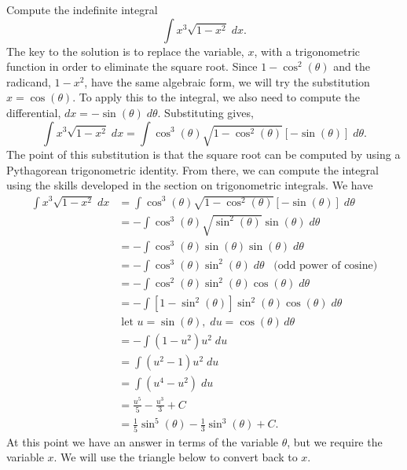 \documentclass[handout]{ximera}
\begin{document}
\begin{example}[example 1]
Compute the indefinite integral
\[
\int x^3 \sqrt{1-x^2} \; dx.
\]
The key to the solution is to replace the variable, $x$, with a trigonometric function 
in order to eliminate the square root.
Since $1-\cos^2(\theta)$ and the radicand, $1-x^2$,
have the same algebraic form, we will try the substitution $x = \cos(\theta)$.
To apply this to the integral, we also need to compute the differential, 
$dx = -\sin(\theta) \; d\theta$.
Substituting gives,
\[
\int x^3 \sqrt{1-x^2} \; dx = \int \cos^3(\theta) \sqrt{1-\cos^2(\theta)} [-\sin(\theta)] \; d\theta.
\]
The point of this substitution is that the square root can be computed by
using a
Pythagorean trigonometric identity. From there, we can compute the integral
using the skills developed in the section on trigonometric integrals.
We have
\begin{align*}
\int x^3 \sqrt{1-x^2} \; dx &= \int \cos^3(\theta) \sqrt{1-\cos^2(\theta)} \left[-\sin(\theta)\right] \; d\theta\\[6pt]
                           &= -\int \cos^3(\theta) \sqrt{\sin^2(\theta)} \sin(\theta) \; d\theta\\[6pt]
                           &= -\int \cos^3(\theta) \sin(\theta) \sin(\theta) \; d\theta\\[6pt]
                           &= -\int \cos^3(\theta) \sin^2(\theta) \; d\theta \; \;\;\text{(odd power of cosine)}\\[6pt]
                           &= -\int \cos^2(\theta) \sin^2(\theta) \cos(\theta) \; d\theta\\[6pt]
                           &= -\int \left[1 - \sin^2(\theta)\right] \sin^2(\theta) \cos(\theta) \; d\theta\\[6pt]
                            & \; \text{let  $u = \sin(\theta), \; du = \cos(\theta) \, d\theta$}\\[6pt]
                           &=-\int (1-u^2)u^2 \; du\\[6pt]
                           &=\int (u^2 -1)u^2 \; du\\[6pt]
                           &=\int (u^4 - u^2) \; du\\[6pt]
                           &=\frac{u^5}{5} - \frac{u^3}{3} + C\\[6pt]
                           &= \frac15 \sin^5(\theta) - \frac13 \sin^3(\theta) + C.
\end{align*}
At this point we have an answer in terms of the variable $\theta$, but we require the variable $x$.
We will use the triangle below to convert back to $x$.


\end{example}
\end{document}
